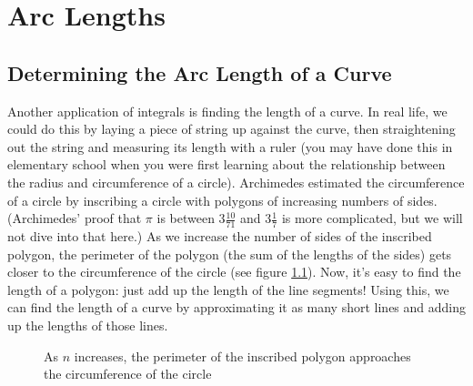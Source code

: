 \chapter{Arc Lengths}

\section{Determining the Arc Length of a Curve}

Another application of integrals is finding the length of a curve. In 
real life, we could do this by laying a piece of string up against 
the curve, then straightening out the string and measuring its length 
with a ruler (you may have done this in elementary school when you 
were first learning about the relationship between the radius and 
circumference of a circle). Archimedes estimated the circumference of 
a circle by inscribing a circle with polygons of increasing numbers 
of sides. (Archimedes' proof that $\pi$ is between $3 \frac{10}{71}$ 
and $3 \frac{1}{7}$ is more complicated, but we will not dive into that 
here.) As we increase the number of sides of the inscribed polygon, 
the perimeter of the polygon (the sum of the lengths of the sides) 
gets closer to the circumference of the circle (see figure 
\ref{fig:circles}). Now, it's easy to find the length of a polygon: 
just add up the length of the line segments! Using this, we can find 
the length of a curve by approximating it as many short lines and 
adding up the lengths of those lines. 

\begin{figure}[htbp]
\centering
    \caption{As $n$ increases, the perimeter of the inscribed polygon 
    approaches the circumference of the circle}
    \label{fig:circles}
\end{figure}


